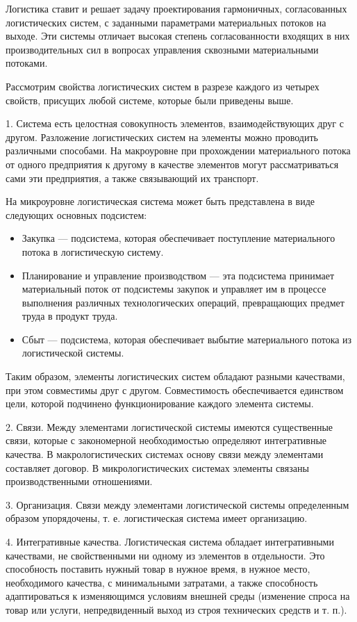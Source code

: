 Логистика ставит и решает задачу проектирования гармоничных, согласованных логистических систем, с заданными параметрами материальных потоков на выходе.
Эти системы отличает высокая степень согласованности входящих в них производительных сил в вопросах управления сквозными материальными потоками.

Рассмотрим свойства логистических систем в разрезе каждого из четырех свойств, присущих любой системе, которые были приведены выше.

1. Система есть целостная совокупность элементов, взаимодействующих друг с другом.
Разложение логистических систем на элементы можно проводить различными способами.
На макроуровне при прохождении материального потока от одного предприятия к другому в качестве элементов могут рассматриваться сами эти предприятия, а также связывающий их транспорт.

На микроуровне логистическая система может быть представлена в виде следующих основных подсистем:
\begin{itemize}
	\item Закупка --- подсистема, которая обеспечивает поступление материального потока в логистическую систему.
	\item Планирование и управление производством --- эта подсистема принимает материальный поток  от подсистемы закупок и управляет им в процессе выполнения различных технологических операций, превращающих предмет труда в продукт труда.
	\item Сбыт --- подсистема, которая обеспечивает выбытие материального потока из логистической системы.
\end{itemize}

Таким образом, элементы логистических систем обладают разными качествами, при этом совместимы друг с другом.
Совместимость обеспечивается единством цели, которой подчинено функционирование каждого элемента системы.

2. Связи.
Между элементами логистической системы имеются существенные связи, которые с закономерной необходимостью определяют интегративные качества.
В макрологистических системах основу связи между элементами составляет договор.
В микрологистических системах элементы связаны производственными отношениями.

3. Организация.
Связи между элементами логистической системы определенным образом упорядочены, т. е. логистическая система имеет организацию.

4. Интегративные качества.
Логистическая система обладает интегративными качествами, не свойственными ни одному из элементов в отдельности.
Это способность поставить нужный товар в нужное время, в нужное место, необходимого качества, с минимальными затратами, а также способность адаптироваться к изменяющимся условиям внешней среды (изменение спроса на товар или услуги, непредвиденный выход из строя технических средств и т. п.).

